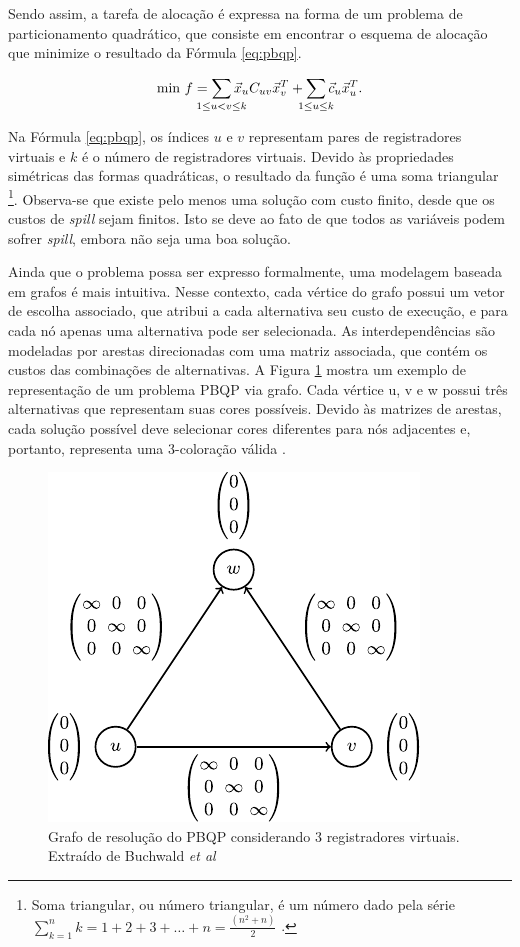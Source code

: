 \documentclass[
	12pt,				%
	openright,			%
	twoside,			%
	a4paper,			%
	tcc,			%
	]{ABNT-DC-UEL}
\begin{document}
Sendo assim, a tarefa de alocação é expressa na forma de um problema de particionamento quadrático, que consiste em encontrar o esquema de alocação que minimize o resultado da Fórmula \ref{eq:pbqp}.

\begin{equation}
    \text{min }f = \sum_{\mathclap{1 \leq u < v \leq k}} \Vec{x}_u C_{uv} \Vec{x}_v^T + \sum_{\mathclap{1 \leq u \leq k}} \Vec{c}_u \Vec{x}_u^T.
    \label{eq:pbqp}
\end{equation}

Na Fórmula \ref{eq:pbqp}, os índices $u$ e $v$ representam pares de registradores virtuais e $k$ é o número de registradores virtuais. Devido às propriedades simétricas das formas quadráticas, o resultado da função é uma soma triangular \footnote{Soma triangular, ou número triangular, é um número dado pela série $\sum_{k=1}^n k=1+2+3+\ldots+n=\frac{(n^2+n)}{2}$ \cite{hoggatt:74}.}. Observa-se que existe pelo menos uma solução com custo finito, desde que os custos de \textit{spill} sejam finitos. Isto se deve ao fato de que todos as variáveis podem sofrer \textit{spill}, embora não seja uma boa solução.

Ainda que o problema possa ser expresso formalmente, uma modelagem baseada em grafos é mais intuitiva. Nesse contexto, cada vértice do grafo possui um vetor de escolha associado, que atribui a cada alternativa seu custo de execução, e para cada nó apenas uma alternativa pode ser selecionada. As interdependências são modeladas por arestas direcionadas com uma matriz associada, que contém os custos das combinações de alternativas. A Figura \ref{fig:9} mostra um exemplo de representação de um problema PBQP via grafo. Cada vértice u, v e w possui três alternativas que representam suas cores possíveis. Devido às matrizes de arestas, cada solução possível deve selecionar cores diferentes para nós adjacentes e, portanto, representa uma 3-coloração válida \cite{buchwald:11}.

\begin{figure}
    \centering
    \includegraphics[scale=1.5]{pbqp}
    \caption{Grafo de resolução do PBQP considerando 3 registradores virtuais. Extraído de Buchwald \textit{et al} \cite{buchwald:11}}
    \label{fig:9}
\end{figure}
\end{document}
